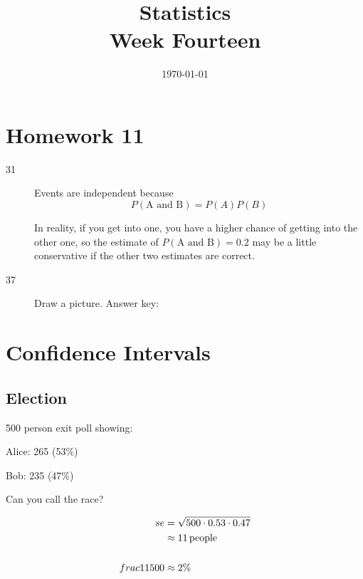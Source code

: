 \documentclass[landscape]{exam}
\title{Statistics \\ Week Fourteen}
\date{\today}
\author{}
\begin{document}
  \maketitle
  \tableofcontents

  \section{Homework 11}
  \begin{description}
    \item[31] Events are independent because
      \[
        P(\text{A and B}) = P(A) P(B)
      \]

      In reality, if you get into one, you have a higher chance of getting into
      the other one, so the estimate of $P(\text{A and B}) = 0.2$ may be a
      little conservative if the other two estimates are correct.


    \item[37] Draw a picture. Answer key:

  \end{description}
  \section{Confidence Intervals}

  \subsection{Election}

  500 person exit poll showing:
  \begin{itemize*}
    \item Alice: 265 (53\%)
    \item Bob: 235 (47\%)
  \end{itemize*}

  Can you call the race?

  \begin{align*}
    se & = \sqrt{500 \cdot 0.53 \cdot 0.47} \\
       & \approx \unit[11]{people} \\
       \\
    frac{11}{500} &\approx 2\%
  \end{align*}
\end{document}
